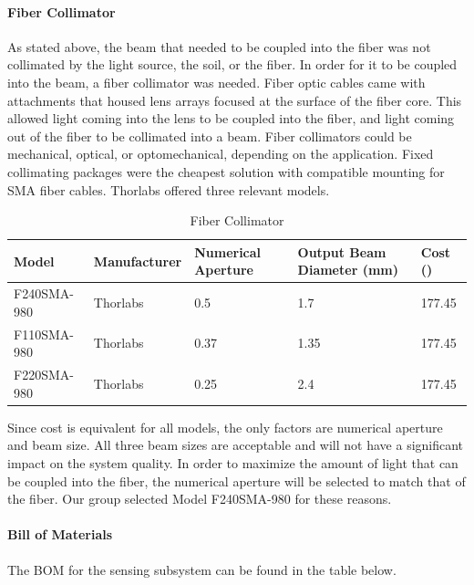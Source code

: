 \paragraph{Fiber Collimator}
As stated above, the beam that needed to be coupled into the fiber was not collimated by the light source, the soil, or the fiber. In order for it to be coupled into the beam, a fiber collimator was needed. Fiber optic cables came with attachments that housed lens arrays focused at the surface of the fiber core. This allowed light coming into the lens to be coupled into the fiber, and light coming out of the fiber to be collimated into a beam. Fiber collimators could be mechanical, optical, or optomechanical, depending on the application. Fixed collimating packages were the cheapest solution with compatible mounting for SMA fiber cables. Thorlabs offered three relevant models.
\begin{table}[H]
	\centering
	\label{table:Fiber Collimator}
	\caption{Fiber Collimator}
	\bigskip
	\begin{tabular}{|p{2cm}|p{2.5cm}|p{2cm}|p{2.75cm}|p{1.75cm}|}
	\hline
	Model & Manufacturer & Numerical Aperture & Output Beam Diameter (mm) & Cost (\textdollar)\\
	\hline
	F240SMA-980 & Thorlabs & 0.5 & 1.7 & 177.45\\
	\hline
	F110SMA-980 & Thorlabs & 0.37 & 1.35 & 177.45\\
	\hline
	F220SMA-980 & Thorlabs & 0.25 & 2.4 & 177.45\\
	\hline
	\end{tabular}
\end{table}


Since cost is equivalent for all models, the only factors are numerical aperture and beam size. All three beam sizes are acceptable and will not have a significant impact on the system quality. In order to maximize the amount of light that can be coupled into the fiber, the numerical aperture will be selected to match that of the fiber. Our group selected Model F240SMA-980 for these reasons.

\paragraph{Bill of Materials}
The BOM for the sensing subsystem can be found in the table below.

